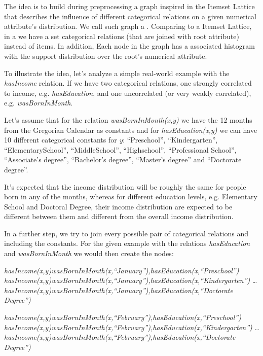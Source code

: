 The idea is to build during preprocessing a graph inspired in the Itemset Lattice that describes the influence of
different categorical relations on a given numerical attribute's distribution. We call such graph a \graphname. Comparing to a Itemset Lattice, in a \graphname we have a set categorical relations (that are joined with root attribute) instead of items. In addition, Each node in the graph has a associated histogram with the support distribution over the root's numerical attribute.

To illustrate the idea, let's analyze a simple real-world example with the \emph{hasIncome} relation. If we have two
categorical relations, one strongly correlated to income, e.g. \emph{hasEducation}, and one uncorrelated (or very weakly
correlated), e.g. \emph{wasBornInMonth}.

Let's assume that for the relation \emph{wasBornInMonth(x,y)} we have the 12 months from the Gregorian Calendar as
constants and for \emph{hasEducation(x,y)} we can have 10 different categorical constants for \emph{y}: ``Preschool'',
``Kindergarten'', ``ElementarySchool'', ``MiddleSchool'', ``Highschool'', ``Professional School'', ``Associate's
degree'', ``Bachelor's degree'', ``Master's degree'' and ``Doctorate degree''. 

It's expected that the income distribution will be roughly the same for people born in any of the months, whereas for different education levels, e.g. Elementary School and Doctoral Degree, their income distribution are expected to be different between them and different from the overall income distribution.

In a further step, we try to join every possible pair of categorical relations and including the constants. For the given example with the relations \emph{hasEducation} and \emph{wasBornInMonth} we would then create the nodes:

  \emph{hasIncome(x,y)wasBornInMonth(x,``January''),hasEducation(x,``Preschool'')} \newline
  \emph{hasIncome(x,y)wasBornInMonth(x,``January''),hasEducation(x,``Kindergarten'')} \newline
  \dots \newline
  \emph{hasIncome(x,y)wasBornInMonth(x,``January''),hasEducation(x,``Doctorate Degree'')} \newline

  \emph{hasIncome(x,y)wasBornInMonth(x,``February''),hasEducation(x,``Preschool'')} \newline
  \emph{hasIncome(x,y)wasBornInMonth(x,``February''),hasEducation(x,``Kindergarten'')} \newline
  \dots \newline
  \emph{hasIncome(x,y)wasBornInMonth(x,``February''),hasEducation(x,``Doctorate Degree'')} \newline
 

